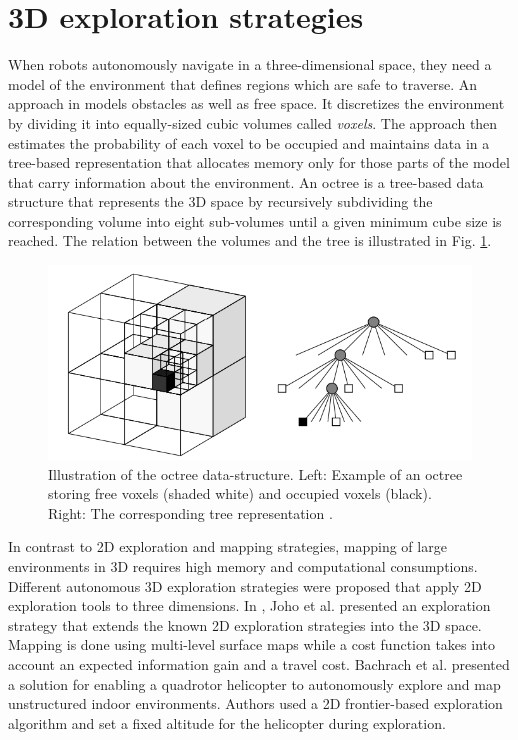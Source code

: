 \section{3D exploration strategies}

When robots autonomously navigate in a three-dimensional space, they need a model of the environment that defines regions which are safe to traverse. An approach in \cite{Wurm2012} models obstacles as well as free space. It discretizes the environment by dividing it into equally-sized cubic volumes called \textit{voxels}. The approach then estimates the probability of each voxel to be occupied and maintains data in a tree-based representation that allocates memory only for those parts of the model that carry information about the environment. 
An octree is a tree-based data structure that represents the 3D space by recursively subdividing the corresponding volume into eight sub-volumes until a given minimum cube size is reached. The relation between the volumes and the tree is illustrated in Fig. \ref{fig:octomap1}.

\begin{figure}[t!]
	\centering
	\includegraphics[width=1.0\columnwidth]{./pictures/octomap.png}	
	\caption{Illustration of the octree data-structure. Left: Example of an octree storing free voxels (shaded white) and occupied voxels (black). Right: The corresponding tree representation \cite{Wurm2012}.}
	\label{fig:octomap1}
\end{figure}


In contrast to 2D exploration and mapping strategies, mapping of large environments in 3D requires high memory and computational consumptions. 
Different autonomous 3D exploration strategies were proposed that apply 2D exploration tools to three dimensions. In \cite{Joho2007}, Joho et al. presented an exploration strategy that extends the known 2D exploration strategies into the 3D space. Mapping is done using multi-level surface maps while a cost function takes
into account an expected information gain and a travel cost. 
Bachrach et
al. \cite{Bachrach2009} presented a solution for enabling a quadrotor helicopter to autonomously explore and map unstructured indoor environments. Authors used a 2D frontier-based exploration algorithm and set a fixed altitude for the helicopter during exploration.  

